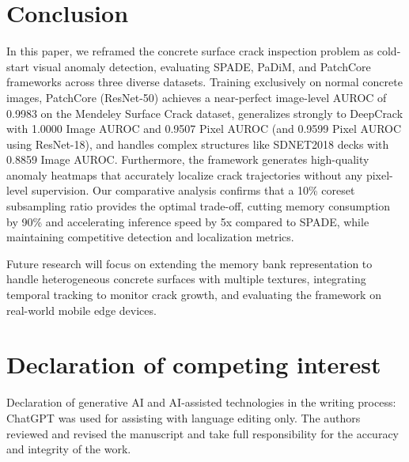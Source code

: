 \documentclass[runningheads]{llncs}
\begin{document}
\section{Conclusion}
\label{sec:conclusion}
In this paper, we reframed the concrete surface crack inspection problem as cold-start visual anomaly detection, evaluating SPADE, PaDiM, and PatchCore frameworks across three diverse datasets. Training exclusively on normal concrete images, PatchCore (ResNet-50) achieves a near-perfect image-level AUROC of 0.9983 on the Mendeley Surface Crack dataset, generalizes strongly to DeepCrack with 1.0000 Image AUROC and 0.9507 Pixel AUROC (and 0.9599 Pixel AUROC using ResNet-18), and handles complex structures like SDNET2018 decks with 0.8859 Image AUROC. Furthermore, the framework generates high-quality anomaly heatmaps that accurately localize crack trajectories without any pixel-level supervision. Our comparative analysis confirms that a 10\% coreset subsampling ratio provides the optimal trade-off, cutting memory consumption by 90\% and accelerating inference speed by 5x compared to SPADE, while maintaining competitive detection and localization metrics.

Future research will focus on extending the memory bank representation to handle heterogeneous concrete surfaces with multiple textures, integrating temporal tracking to monitor crack growth, and evaluating the framework on real-world mobile edge devices.

\section*{Declaration of competing interest}
Declaration of generative AI and AI-assisted technologies in the writing process: ChatGPT was used for assisting with language editing only. The authors reviewed and revised the manuscript and take full responsibility for the accuracy and integrity of the work.



\end{document}

